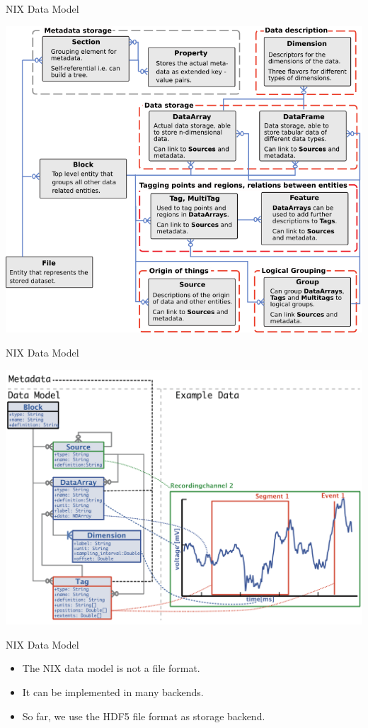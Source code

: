 \documentclass[pdftex]{beamer}
\begin{document}
\begin{frame}{NIX Data Model}
    \begin{center}
        \includegraphics[width=0.7\columnwidth]{../day_1/resources/data_model_overview}
    \end{center}
\end{frame}


\begin{frame}{NIX Data Model}
    \begin{center}
        \includegraphics[width=0.75\columnwidth]{../day_1/resources/example_signal}
    \end{center}
\end{frame}


\begin{frame}{NIX Data Model}
    \begin{itemize}
        \item The NIX data model is not a file format.
        \vspace{1ex}
        \item It can be implemented in many backends.
        \vspace{1ex}
        \item So far, we use the HDF5 file format as storage backend.
    \end{itemize}
\end{frame}
\end{document}

